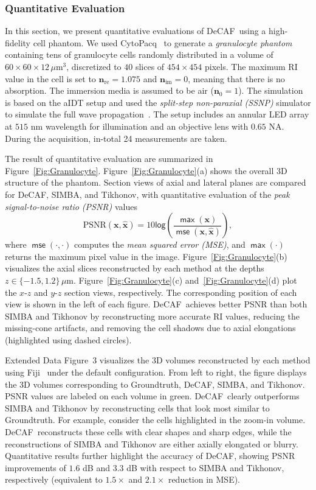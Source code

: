\documentclass[11pt]{article}
\theoremstyle{plain} %
\def\max{\mathop{\mathsf{max}}}
\def\mse{\mathop{\mathsf{mse}}}
\def\log{\mathsf{log}}
\def\proposed{DeCAF}
\def\xbm{{\bm{x}}}
\def\nbm{{\bm{n}}}
\def\xbmhat{{\widehat{\bm{x}}}}
\begin{document}
\subsubsection*{Quantitative Evaluation}
In this section, we present quantitative evaluations of \proposed~using a high-fidelity cell phantom. 
We used CytoPacq~\cite{Wiesner.etal2019} to generate a \emph{granulocyte phantom} containing tens of granulocyte cells randomly distributed in a volume of $60\times60\times12\,\mu\text{m}^3$, discretized to $40$ slices of $454\times454$ pixels.
The maximum RI value in the cell is set to $\nbm_\text{re} = 1.075$ and $\nbm_\text{im} = 0$, meaning that there is no absorption.  The immersion media is assumed to be air ($\nbm_0=1$).
The simulation is based on the aIDT setup and used the \emph{split-step non-paraxial (SSNP)} simulator to simulate the full wave propagation~\cite{Lim.etal2019,zhu_intensity_2021}. The setup includes an annular LED array at $515$ nm wavelength for illumination and an objective lens with $0.65$ NA. During the acquisition,  in-total 24 measurements are taken. 

The result of quantitative evaluation are summarized in Figure~\ref{Fig:Granulocyte}. Figure~\ref{Fig:Granulocyte}(a) shows the overall 3D structure of the phantom.
Section views of axial and lateral planes are compared for \proposed, SIMBA, and Tikhonov, with quantitative evaluation of the \emph{peak signal-to-noise ratio (PSNR)} values 
\begin{equation}
\label{eq:PSNR}
\text{PSNR}(\xbm, \xbmhat) =  10\log\left(\frac{\max(\xbm)}{\mse(\xbm,\xbmhat)}\right),
\end{equation}
where $\mse(\cdot,\cdot)$ computes the \emph{mean squared error (MSE)}, and $\max(\cdot)$ returns the maximum pixel value in the image. Figure~\ref{Fig:Granulocyte}(b) visualizes the axial slices reconstructed by each method at the depths $z\in\{-1.5, 1.2\}\,\mu\text{m}$. 
Figure~\ref{Fig:Granulocyte}(c) and~\ref{Fig:Granulocyte}(d)  plot the $x$-$z$ and $y$-$z$ section views, respectively. The corresponding position of each view is shown in the left of each figure. \proposed~achieves better PSNR than both SIMBA and Tikhonov by reconstructing more accurate RI values, reducing the missing-cone artifacts, and removing the cell shadows due to axial elongations (highlighted using dashed circles). 

Extended Data Figure~3 visualizes the 3D volumes reconstructed by each method using Fiji~\cite{Schindelin:2012ty} under the default configuration. 
From left to right, the figure displays the 3D volumes corresponding to Groundtruth, \proposed, SIMBA, and Tikhonov. PSNR values are labeled on each volume in green.
\proposed~clearly outperforms SIMBA and Tikhonov by reconstructing cells that look most similar to Groundtruth. 
For example, consider the cells highlighted in the zoom-in volume. 
\proposed~reconstructs these cells with clear shapes and sharp edges, while the reconstructions of SIMBA and Tikhonov are either axially elongated or blurry.  Quantitative results further highlight the accuracy of \proposed, showing PSNR improvements of $1.6$ dB and $3.3$ dB with respect to SIMBA and Tikhonov, respectively (equivalent to $1.5\times$ and $2.1\times$ reduction in MSE). 
\end{document}
